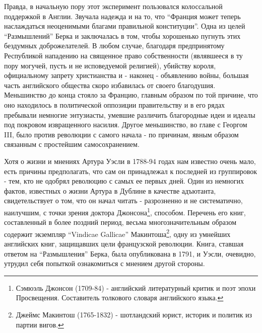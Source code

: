 \documentclass[
  oneside,
  12pt,
  titlepage]{book}
\begin{document}
Правда, в начальную пору этот эксперимент пользовался колоссальной поддержкой в Англии. Звучала надежда и на то, что ``Франция может теперь наслаждаться неоценимыми благами правильной конституции''. Одна из целей ``Размышлений'' Берка и заключалась в том, чтобы хорошенько пугнуть этих бездумных доброжелателей. В любом случае, благодаря предпринятому Республикой нападению на священное право собственности (являвшееся в ту пору могучей, пусть и не исповедуемой религией), убийству короля, официальному запрету христианства и - наконец - объявлению войны, большая часть английского общества скоро избавилась от своего благодушия. Меньшинство до конца стояло за Францию, главным образом по той причине, что оно находилось в политической оппозиции правительству и в его рядах пребывали немногие энтузиасты, умевшие различить благородные идеи и идеалы под покровом извращенного насилия. Другое меньшинство, во главе с Георгом III, было против революции с самого начала - по причинам, явным образом связанным с простейшим самосохранением.

Хотя о жизни и мнениях Артура Уэсли в 1788-94 годах нам известно очень мало, есть причины предполагать, что сам он принадлежал к последней из группировок - тем, кто не одобрял революцию с самых ее первых дней. Один из немногих фактов, известных о жизни Артура в Дублине в качестве адъютанта, свидетельствует о том, что он начал читать - разрозненно и не систематично, наилучшим, с точки зрения доктора Джонсона\footnote{Сэмюэль Джонсон (1709-84) - английский литературный критик и поэт эпохи Просвещения. Составитель толкового словаря английского языка.}, способом. Перечень его книг, составленный в более поздний период, весьма многозначительным образом содержит экземпляр ``Vindicae Gallicae'' Макинтоша\footnote{Джеймс Макинтош (1765-1832) - шотландский юрист, историк и политик из партии вигов.}, одну из умнейших английских книг, защищавших цели французской революции. Книга, ставшая ответом на ``Размышления'' Берка, была опубликована в 1791, и Уэсли, очевидно, утрудил себя попыткой ознакомиться с мнением другой стороны.
\end{document}
